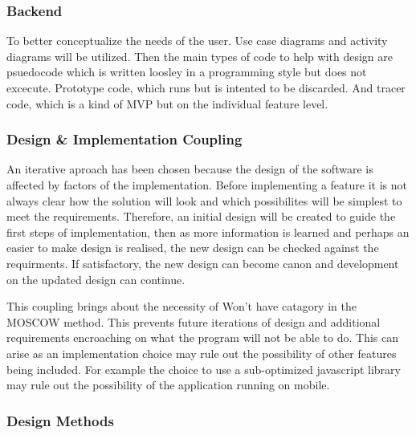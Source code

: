     \subsubsection{Backend}
      To better conceptualize the needs of the user. Use case diagrams and activity diagrams will be utilized. Then the main types of code to help with design are psuedocode which is written loosley in a programming style but does not excecute. Prototype code, which runs but is intented to be discarded. And tracer code, which is a kind of MVP but on the individual feature level.
    \subsubsection{Design \& Implementation Coupling}
      An iterative aproach has been chosen because the design of the software is affected by factors of the implementation. Before implementing a feature it is not always clear how the solution will look and which possibilites will be simplest to meet the requirements. Therefore, an initial design will be created to guide the first steps of implementation, then as more information is learned and perhaps an easier to make design is realised, the new design can be checked against the requirments. If satisfactory, the new design can become canon and development on the updated design can continue.
      \par
      This coupling brings about the necessity of Won't have catagory in the MOSCOW method. This prevents future iterations of design and additional requirements encroaching on what the program will not be able to do. This can arise as an implementation choice may rule out the possibility of other features being included. For example the choice to use a sub-optimized javascript library may rule out the possibility of the application running on mobile.
    \subsubsection{Design Methods}

